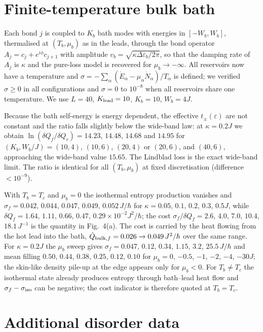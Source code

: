 \documentclass[aps,prl,superscriptaddress,nofootinbib,onecolumn,notitlepage,11pt]{revtex4-2}
\newcommand{\dQ}{\delta Q}
\begin{document}
\section{Finite-temperature bulk bath}
\label{sec:bath}

Each bond $j$ is coupled to $K_b$ bath modes with energies in $[-W_b,W_b]$, thermalised at $(T_b,\mu_b)$ as in the leads, through the bond operator $A_j=c_j+e^{i\phi}c_{j+1}$ with amplitude $v_b=\sqrt{\kappa\Delta\varepsilon_b/2\pi}$, so that the damping rate of $A_j$ is $\kappa$ and the pure-loss model is recovered for $\mu_b\to-\infty$. All reservoirs now have a temperature and $\sigma=-\sum_\alpha(\dot E_\alpha-\mu_\alpha\dot N_\alpha)/T_\alpha$ is defined; we verified $\sigma\ge0$ in all configurations and $\sigma=0$ to $10^{-8}$ when all reservoirs share one temperature. We use $L=40$, $K_{\rm lead}=10$, $K_b=10$, $W_b=4J$.

Because the bath self-energy is energy dependent, the effective $t_\pm(\varepsilon)$ are not constant and the ratio falls slightly below the wide-band law: at $\kappa=0.2J$ we obtain $\ln(\dQ_f/\dQ_r)=14.23$, $14.48$, $14.68$ and $14.95$ for $(K_b,W_b/J)=(10,4)$, $(10,6)$, $(20,4)$ or $(20,6)$, and $(40,6)$, approaching the wide-band value $15.65$. The Lindblad loss is the exact wide-band limit. The ratio is identical for all $(T_b,\mu_b)$ at fixed discretisation (difference $<10^{-9}$).

With $T_b=T_c$ and $\mu_b=0$ the isothermal entropy production vanishes and $\sigma_f=0.042$, $0.044$, $0.047$, $0.049$, $0.052\,J/\hbar$ for $\kappa=0.05$, $0.1$, $0.2$, $0.3$, $0.5J$, while $\dQ_f=1.64$, $1.11$, $0.66$, $0.47$, $0.29\times10^{-2}J^2/\hbar$; the cost $\sigma_f/\dQ_f=2.6$, $4.0$, $7.0$, $10.4$, $18.1\,J^{-1}$ is the quantity in Fig.~4(a). The cost is carried by the heat flowing from the hot lead into the bath, $\dot Q_{{\rm bulk},f}=0.026\to0.049\,J^2/\hbar$ over the same range. For $\kappa=0.2J$ the $\mu_b$ sweep gives $\sigma_f=0.047$, $0.12$, $0.34$, $1.15$, $3.2$, $25.5\,J/\hbar$ and mean filling $0.50$, $0.44$, $0.38$, $0.25$, $0.12$, $0.10$ for $\mu_b=0$, $-0.5$, $-1$, $-2$, $-4$, $-30J$; the skin-like density pile-up at the edge appears only for $\mu_b<0$. For $T_b\neq T_c$ the isothermal state already produces entropy through bath--lead heat flow and $\sigma_f-\sigma_{\rm iso}$ can be negative; the cost indicator is therefore quoted at $T_b=T_c$.

\section{Additional disorder data}
\label{sec:disorder}
\end{document}
